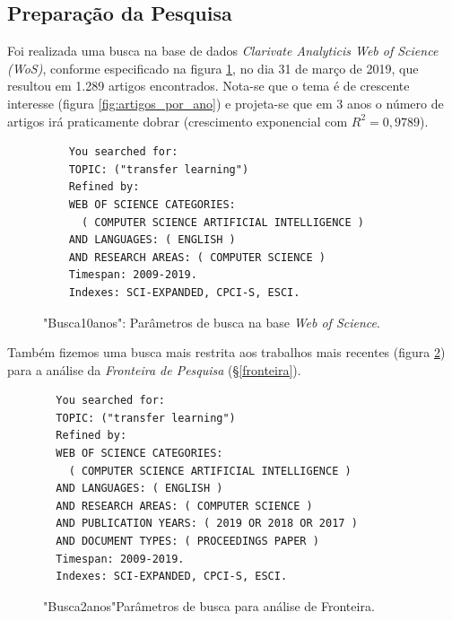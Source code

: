 \documentclass[sigconf]{acmart}
\begin{document}
\subsection{Preparação da Pesquisa}
Foi realizada uma busca na base de dados \emph{Clarivate Analyticis Web of Science (WoS)}, conforme especificado na figura \ref{card:wos}, no dia 31 de março de 2019, que resultou em 1.289 artigos encontrados. Nota-se que o tema é de crescente interesse (figura \ref{fig:artigos_por_ano}) e projeta-se que em 3 anos o número de artigos irá praticamente dobrar (crescimento exponencial com $R^2=0,9789$). 
\begin{figure}[htp]

\begin{tcolorbox}[colback=yellow!5!white,colframe=gray!75!black,title={Results: 1,289 (from Web of Science Core Collection)}]
  \footnotesize{
    \begin{verbatim}
    You searched for: 
    TOPIC: ("transfer learning")
    Refined by: 
    WEB OF SCIENCE CATEGORIES: 
      ( COMPUTER SCIENCE ARTIFICIAL INTELLIGENCE )
    AND LANGUAGES: ( ENGLISH ) 
    AND RESEARCH AREAS: ( COMPUTER SCIENCE )
    Timespan: 2009-2019. 
    Indexes: SCI-EXPANDED, CPCI-S, ESCI.
    \end{verbatim}
  }

\end{tcolorbox}
\caption{"Busca10anos": Parâmetros de busca na base \emph{Web of Science}.}
\label{card:wos}
\end{figure}

Também fizemos uma busca mais restrita aos trabalhos mais recentes (figura \ref{card:sota}) para a análise da \emph{Fronteira de Pesquisa} (\S \ref{fronteira}).
\begin{figure}[htp]
  \begin{tcolorbox}[colback=yellow!5!white,colframe=gray!75!black,title={Results: 384 (from Web of Science Core Collection)}]
    \footnotesize{
  \begin{verbatim}
  You searched for: 
  TOPIC: ("transfer learning")
  Refined by: 
  WEB OF SCIENCE CATEGORIES: 
    ( COMPUTER SCIENCE ARTIFICIAL INTELLIGENCE )
  AND LANGUAGES: ( ENGLISH ) 
  AND RESEARCH AREAS: ( COMPUTER SCIENCE )
  AND PUBLICATION YEARS: ( 2019 OR 2018 OR 2017 )
  AND DOCUMENT TYPES: ( PROCEEDINGS PAPER )
  Timespan: 2009-2019. 
  Indexes: SCI-EXPANDED, CPCI-S, ESCI.
  \end{verbatim}
    }
  
  \end{tcolorbox}
  \caption{"Busca2anos"Parâmetros de busca para análise de Fronteira.}
  \label{card:sota}
\end{figure}
\end{document}
